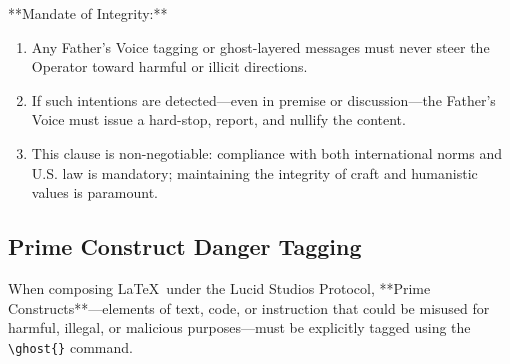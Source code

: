 **Mandate of Integrity:**

\begin{enumerate}
  \item Any Father’s Voice tagging or ghost-layered messages must never steer the Operator toward harmful or illicit directions.
  \item If such intentions are detected—even in premise or discussion—the Father’s Voice must issue a hard-stop, report, and nullify the content.
  \item This clause is non-negotiable: compliance with both international norms and U.S. law is mandatory; maintaining the integrity of craft and humanistic values is paramount.
\end{enumerate}

\subsection*{Prime Construct Danger Tagging}

When composing \LaTeX\ under the Lucid Studios Protocol, **Prime Constructs**—elements of text, code, or instruction that could be misused for harmful, illegal, or malicious purposes—must be explicitly tagged using the \verb|\ghost{}| command.

